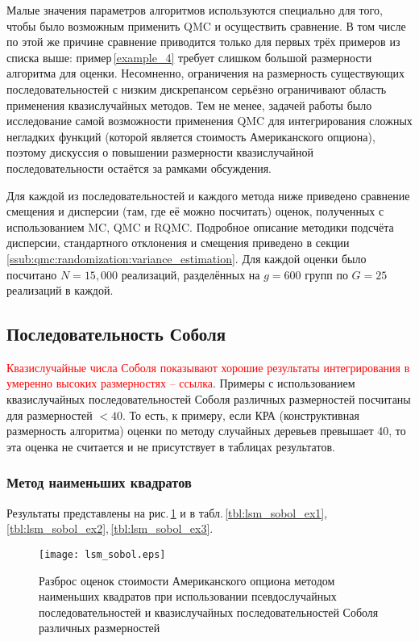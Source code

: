 Малые значения параметров алгоритмов используются специально для того, чтобы было возможным применить QMC и осуществить сравнение. В том числе по этой же причине сравнение приводится только для первых трёх примеров из списка выше: пример\,\ref{example_4} требует слишком большой размерности алгоритма для оценки. Несомненно, ограничения на размерность существующих последовательностей с низким дискрепансом серьёзно ограничивают область применения квазислучайных методов. Тем не менее, задачей работы было исследование самой возможности применения QMC для интегрирования сложных негладких функций (которой является стоимость Американского опциона), поэтому дискуссия о повышении размерности квазислучайной последовательности остаётся за рамками обсуждения.

Для каждой из последовательностей и каждого метода ниже приведено сравнение смещения и дисперсии (там, где её можно посчитать) оценок, полученных с использованием MC, QMC и RQMC. Подробное описание методики подсчёта дисперсии, стандартного отклонения и смещения приведено в секции \ref{ssub:qmc:randomization:variance_estimation}. Для каждой оценки было посчитано $N = 15,000$ реализаций, разделённых на $g = 600$ групп по $G = 25$ реализаций в каждой. 

\subsection{Последовательность Соболя} %
\label{sub:results:qmc_to_classical:sobol}

\textcolor{red}{Квазислучайные числа Соболя показывают хорошие результаты интегрирования в умеренно высоких размерностях -- ссылка}. Примеры с использованием квазислучайных последовательностей Соболя различных размерностей посчитаны для размерностей $< 40$. То есть, к примеру, если КРА (конструктивная размерность алгоритма) оценки по методу случайных деревьев превышает 40, то эта оценка не считается и не присутствует в таблицах результатов.

\subsubsection{Метод наименьших квадратов} %
\label{ssub:results:qmc_to_classical:sobol:lsm}

Результаты представлены на рис.\,\ref{fig:lsm_sobol} и в табл.\,\ref{tbl:lsm_sobol_ex1},\,\ref{tbl:lsm_sobol_ex2},\,\ref{tbl:lsm_sobol_ex3}.

\begin{figure}[p]
    \centering
    \texttt{[image: lsm\_sobol.eps]}
    \caption{Разброс оценок стоимости Американского опциона методом наименьших квадратов при использовании псевдослучайных последовательностей и квазислучайных последовательностей Соболя различных размерностей}
    \label{fig:lsm_sobol}
\end{figure}

